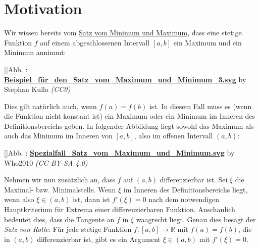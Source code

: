 \documentclass[fontsize=9pt,
               parskip=half-,
               DIV=14,
               listof=chapterentry,
               tocflat]{scrbook}
\newcounter{imagelabel}
\begin{document}
\section{Motivation}

Wir wissen bereits vom \href{https://de.wikibooks.org/wiki/Mathe\_für\_Nicht-Freaks:\_Satz\_vom\_Minimum\_und\_Maximum}
{Satz vom Minimum und Maximum}, dass eine stetige Funktion $f$ auf einem abgeschlossenen Intervall $[a,b]$ ein Maximum und ein Minimum annimmt:

[]{Abb. : \protect\href{https://commons.wikimedia.org/wiki/File:Beispiel_für_den_Satz_vom_Maximum_und_Minimum_3.svg}{\textbf{Beispiel\allowbreak\_für\allowbreak\_den\allowbreak\_Satz\allowbreak\_vom\allowbreak\_Maximum\allowbreak\_und\allowbreak\_Minimum\allowbreak\_3.svg}} by Stephan Kulla \textit{(CC0)}}\begin{center}
\end{center}

Dies gilt natürlich auch, wenn $f(a)=f(b)$ ist. In diesem Fall muss es (wenn die Funktion nicht konstant ist) ein Maximum oder ein Minimum im Inneren des Definitionsbereichs geben. In folgender Abbildung liegt sowohl das Maximum als auch das Minimum im Inneren von $[a,b]$, also im offenen Intervall $(a,b)$:

[]{Abb. : \protect\href{https://commons.wikimedia.org/wiki/File:Spezialfall_Satz_vom_Maximum_und_Minimum.svg}{\textbf{Spezialfall\allowbreak\_Satz\allowbreak\_vom\allowbreak\_Maximum\allowbreak\_und\allowbreak\_Minimum.svg}} by Who2010 \textit{(CC BY-SA 4.0)}}\begin{center}
\end{center}

Nehmen wir nun zusätzlich an, dass $f$ auf $(a,b)$ differenzierbar ist. Sei $\xi $ die Maximal- bzw. Minimalstelle. Wenn $\xi $ im Inneren des Definitionsbereichs liegt, wenn also $\xi \in (a,b)$ ist, dann ist $f'(\xi )=0$ nach dem notwendigen Hauptkriterium für Extrema einer differenzierbaren Funktion. Anschaulich bedeutet dies, dass die Tangente an $f$ in $\xi $ waagrecht liegt. Genau dies besagt der \emph{Satz von Rolle}: Für jede stetige Funktion $f:[a,b]\to \mathbb {R} $ mit $f(a)=f(b)$, die in $(a,b)$ differenzierbar ist, gibt es ein Argument $\xi \in (a,b)$ mit $f'(\xi )=0$.
\end{document}

